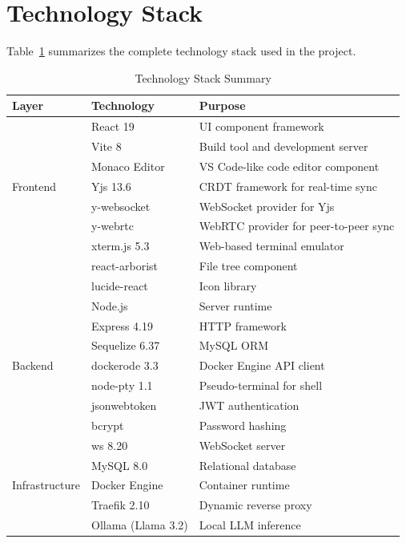 \documentclass[12pt,a4paper,oneside]{report}
\begin{document}
\section{Technology Stack}

Table~\ref{tab:techstack} summarizes the complete technology stack used in the project.

\begin{table}[H]
\centering
\caption{Technology Stack Summary}
\label{tab:techstack}
\begin{tabularx}{\textwidth}{llX}
\toprule
\textbf{Layer} & \textbf{Technology} & \textbf{Purpose} \\
\midrule
\multirow{7}{*}{Frontend} & React 19 & UI component framework \\
 & Vite 8 & Build tool and development server \\
 & Monaco Editor & VS Code-like code editor component \\
 & Yjs 13.6 & CRDT framework for real-time sync \\
 & y-websocket & WebSocket provider for Yjs \\
 & y-webrtc & WebRTC provider for peer-to-peer sync \\
 & xterm.js 5.3 & Web-based terminal emulator \\
 & react-arborist & File tree component \\
 & lucide-react & Icon library \\
\midrule
\multirow{7}{*}{Backend} & Node.js & Server runtime \\
 & Express 4.19 & HTTP framework \\
 & Sequelize 6.37 & MySQL ORM \\
 & dockerode 3.3 & Docker Engine API client \\
 & node-pty 1.1 & Pseudo-terminal for shell \\
 & jsonwebtoken & JWT authentication \\
 & bcrypt & Password hashing \\
 & ws 8.20 & WebSocket server \\
\midrule
\multirow{3}{*}{Infrastructure} & MySQL 8.0 & Relational database \\
 & Docker Engine & Container runtime \\
 & Traefik 2.10 & Dynamic reverse proxy \\
 & Ollama (Llama 3.2) & Local LLM inference \\
\bottomrule
\end{tabularx}
\end{table}
\end{document}
